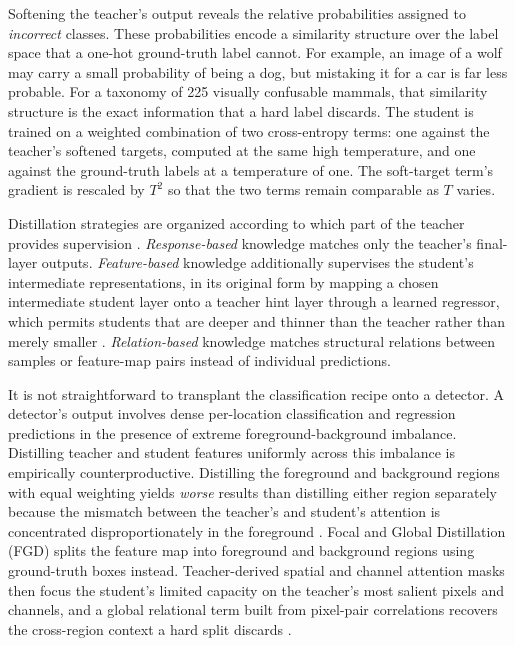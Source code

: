 Softening the teacher's output reveals the relative probabilities assigned to \emph{incorrect} classes. These probabilities encode a similarity structure over the label space that a one-hot ground-truth label cannot. For example, an image of a wolf may carry a small probability of being a dog, but mistaking it for a car is far less probable. For a taxonomy of 225 visually confusable mammals, that similarity structure is the exact information that a hard label discards. The student is trained on a weighted combination of two cross-entropy terms: one against the teacher's softened targets, computed at the same high temperature, and one against the ground-truth labels at a temperature of one. The soft-target term's gradient is rescaled by $T^2$ so that the two terms remain comparable as $T$ varies.

Distillation strategies are organized according to which part of the teacher provides supervision \cite{gouKnowledgeDistillationSurvey2021}. \emph{Response-based} knowledge matches only the teacher's final-layer outputs. \emph{Feature-based} knowledge additionally supervises the student's intermediate representations, in its original form by mapping a chosen intermediate student layer onto a teacher hint layer through a learned regressor, which permits students that are deeper and thinner than the teacher rather than merely smaller \cite{romeroFitNetsHintsThin2015}. \emph{Relation-based} knowledge matches structural relations between samples or feature-map pairs instead of individual predictions.

It is not straightforward to transplant the classification recipe onto a detector. A detector's output involves dense per-location classification and regression predictions in the presence of extreme foreground-background imbalance. Distilling teacher and student features uniformly across this imbalance is empirically counterproductive. Distilling the foreground and background regions with equal weighting yields \emph{worse} results than distilling either region separately because the mismatch between the teacher's and student's attention is concentrated disproportionately in the foreground \cite{yangFocalGlobalKnowledge2022}. Focal and Global Distillation (FGD) splits the feature map into foreground and background regions using ground-truth boxes instead. Teacher-derived spatial and channel attention masks then focus the student's limited capacity on the teacher's most salient pixels and channels, and a global relational term built from pixel-pair correlations recovers the cross-region context a hard split discards \cite{yangFocalGlobalKnowledge2022}.

